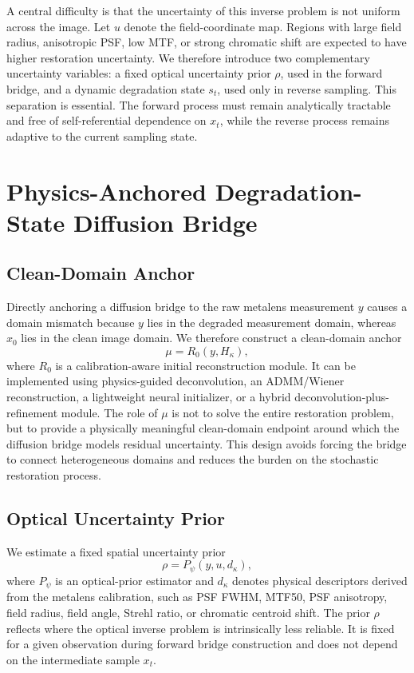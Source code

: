 \documentclass[journal]{IEEEtran}
\newcommand{\hk}{H_{\kappa}}
\begin{document}
A central difficulty is that the uncertainty of this inverse problem is not uniform across the image. Let $u$ denote the field-coordinate map. Regions with large field radius, anisotropic PSF, low MTF, or strong chromatic shift are expected to have higher restoration uncertainty. We therefore introduce two complementary uncertainty variables: a fixed optical uncertainty prior $\rho$, used in the forward bridge, and a dynamic degradation state $s_t$, used only in reverse sampling. This separation is essential. The forward process must remain analytically tractable and free of self-referential dependence on $x_t$, while the reverse process remains adaptive to the current sampling state.

\section{Physics-Anchored Degradation-State Diffusion Bridge}
\subsection{Clean-Domain Anchor}
Directly anchoring a diffusion bridge to the raw metalens measurement $y$ causes a domain mismatch because $y$ lies in the degraded measurement domain, whereas $x_0$ lies in the clean image domain. We therefore construct a clean-domain anchor
\begin{equation}
    \mu = R_0(y,\hk),
    \label{eq:anchor}
\end{equation}
where $R_0$ is a calibration-aware initial reconstruction module. It can be implemented using physics-guided deconvolution, an ADMM/Wiener reconstruction, a lightweight neural initializer, or a hybrid deconvolution-plus-refinement module. The role of $\mu$ is not to solve the entire restoration problem, but to provide a physically meaningful clean-domain endpoint around which the diffusion bridge models residual uncertainty. This design avoids forcing the bridge to connect heterogeneous domains and reduces the burden on the stochastic restoration process.

\subsection{Optical Uncertainty Prior}
We estimate a fixed spatial uncertainty prior
\begin{equation}
    \rho = P_{\psi}(y,u,d_{\kappa}),
    \label{eq:rho}
\end{equation}
where $P_{\psi}$ is an optical-prior estimator and $d_{\kappa}$ denotes physical descriptors derived from the metalens calibration, such as PSF FWHM, MTF50, PSF anisotropy, field radius, field angle, Strehl ratio, or chromatic centroid shift. The prior $\rho$ reflects where the optical inverse problem is intrinsically less reliable. It is fixed for a given observation during forward bridge construction and does not depend on the intermediate sample $x_t$.
\end{document}
